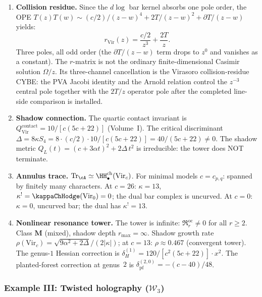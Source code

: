 \begin{computation}
\begin{enumerate}[label=\textup{(\roman*)},nosep]
\item \textbf{Collision residue.}
 Since the $d\log$ bar kernel absorbs one pole order,
 the OPE $T(z)T(w) \sim (c/2)/(z-w)^4 + 2T/(z-w)^2 + \partial T/(z-w)$
 yields:
 \begin{equation}\label{eq:platonic-r-Vir}
 r_{\mathrm{Vir}}(z)
 = \frac{c/2}{z^3} + \frac{2T}{z}.
	 \end{equation}
	 Three poles, all odd order (the $\partial T/(z-w)$ term drops
	 to $z^0$ and vanishes as a constant). The $r$-matrix is not the
	 ordinary finite-dimensional Casimir solution \(\Omega/z\).  Its
	 three-channel cancellation is the Virasoro collision-residue CYBE:
	 the PVA Jacobi identity and the Arnold relation control the
	 \(z^{-3}\) central pole together with the \(2T/z\) operator pole
	 after the completed line-side comparison is installed.

\item \textbf{Shadow connection.}
 The quartic contact invariant is
 $Q^{\mathrm{contact}}_{\mathrm{Vir}} = 10/[c(5c+22)]$
 \textup{(}Volume~I\textup{)}.
 The critical discriminant
 $\Delta = 8\kappa S_4 = 8 \cdot (c/2) \cdot 10/[c(5c+22)]
 = 40/(5c+22) \ne 0$.
 The shadow metric $Q_L(t) = (c + 3\alpha t)^2 + 2\Delta\, t^2$
 is irreducible: the tower does NOT terminate.

\item \textbf{Annulus trace.}
 $\mathrm{Tr}_\cA \simeq \HH^{\mathrm{ch}}_\bullet(\mathrm{Vir}_c)$.
 For minimal models $c = c_{p,q}$:
 spanned by finitely many characters.
 At $c = 26$: $\kappa = 13$, $\kappa^! = \kappaChHodge(\mathrm{Vir}_0) = 0$;
 the dual bar complex is uncurved.
 At $c = 0$: $\kappa = 0$, uncurved bar; the dual has $\kappa^! = 13$.

\item \textbf{Nonlinear resonance tower.}
 The tower is infinite: $\mathfrak{R}^{\mathrm{oc}}_r \ne 0$
 for all $r \ge 2$.
 Class $\mathbf{M}$ (mixed), shadow depth $r_{\max} = \infty$.
 Shadow growth rate $\rho(\mathrm{Vir}_c) =
 \sqrt{9\alpha^2 + 2\Delta}/(2|\kappa|)$;
 at $c = 13$: $\rho \approx 0.467$ (convergent tower).
 The genus-$1$ Hessian correction is
 $\delta_H^{(1)} = 120/[c^2(5c+22)] \cdot x^2$.
 The planted-forest correction at genus~$2$ is
 $\delta_{\mathrm{pf}}^{(2,0)} = -(c - 40)/48$.
\end{enumerate}
\end{computation}


\subsubsection{Example III: Twisted holography (\texorpdfstring{$\mathcal{W}_3$}{W\_3})}
\label{subsubsec:platonic-W3}

